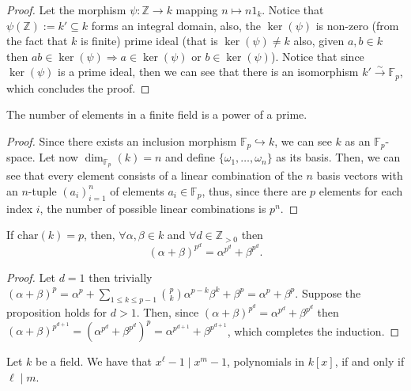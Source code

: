 \begin{proof}
   Let the morphism \(\psi: \mathbb{Z} \to k\) mapping \(n \mapsto n 1_k\).
   Notice that \(\psi(\mathbb{Z}) := k' \subseteq k\) forms an integral domain,
   also, the \(\ker(\psi)\) is non-zero (from the fact that \(k\) is finite) 
   prime ideal (that is \(\ker(\psi) \neq k\) also, given \(a, b \in k\) then
   \(ab \in \ker(\psi) \Rightarrow a \in \ker(\psi)\) or \(b \in \ker(\psi)\)).
   Notice that since \(\ker(\psi)\) is a prime ideal, then we can see that there
   is an isomorphism \(k' \xrightarrow{\sim} \mathbb{F}_p\), which concludes the
   proof.
\end{proof}

\begin{proposition}
   The number of elements in a finite field is a power of a prime.
\end{proposition}

\begin{proof}
   Since there exists an inclusion morphism \(\mathbb{F}_p \hookrightarrow k\),
   we can see \(k\) as an \(\mathbb{F}_p\)-space. Let now
   \(\dim_{\mathbb{F}_p}(k) = n\) and define \(\{\omega_1, \dots, \omega_n\}\)
   as its basis. Then, we can see that every element consists of a linear
   combination of the \(n\) basis vectors with an \(n\)-tuple \((a_i)_{i=1}^n\)
   of elements \(a_i \in \mathbb{F}_p\), thus, since there are \(p\) elements
   for each index \(i\), the number of possible linear combinations is \(p^n\).
\end{proof}

\begin{proposition}
   If \(\mathrm{char}(k) = p\), then, \(\forall \alpha, \beta \in k\) and \(\forall d
   \in \mathbb{Z}_{>0}\) then
   \[
      (\alpha + \beta)^{p^d} = \alpha^{p^d} + \beta^{p^d}.
   \] 
\end{proposition}

\begin{proof}
   Let \(d = 1\) then trivially  \((\alpha + \beta)^p = \alpha^p + \sum_{1
   \leqslant k \leqslant p-1} \binom{p}{k} \alpha^{p-k}\beta^k + \beta^p =
   \alpha^p + \beta^p\). Suppose the proposition holds for \(d > 1\). Then,
   since \((\alpha + \beta)^{p^d} = \alpha^{p^d} + \beta^{p^d}\) then
   \((\alpha + \beta)^{p^{d+1}} = (\alpha^{p^d} + \beta^{p^d})^p
   = \alpha^{p^{d+1}} + \beta^{p^{d+1}}\), which completes the induction.
\end{proof}

\begin{proposition}
   Let \(k\) be a field. We have that \(x^\ell - 1 \mid x^m - 1\), polynomials in
   \(k[x]\), if and only if \(\ell \mid m\).
\end{proposition}

